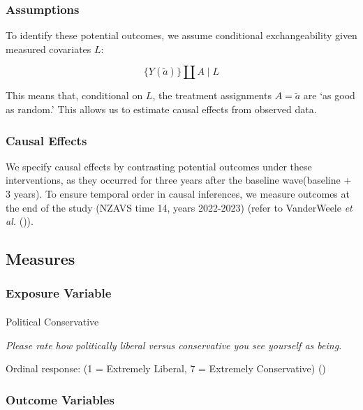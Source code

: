\documentclass[
  single column]{article}
\makeatletter
\let\oldparagraph\paragraph
\renewcommand{\paragraph}{
    \@ifstar
      \xxxParagraphStar
      \xxxParagraphNoStar
  }
\newcommand{\xxxParagraphStar}[1]{\oldparagraph*{#1}\mbox{}}
\newcommand{\xxxParagraphNoStar}[1]{\oldparagraph{#1}\mbox{}}
\makeatother
\begin{document}
\subsubsection{Assumptions}\label{assumptions}

To identify these potential outcomes, we assume conditional
exchangeability given measured covariates \(L\):

\[
\Big\{ Y(\tilde{a}) \Big\} \coprod A \mid L
\]

This means that, conditional on \(L\), the treatment assignments
\(A = \tilde{a}\) are `as good as random.' This allows us to estimate
causal effects from observed data.

\subsubsection{Causal Effects}\label{causal-effects}

We specify causal effects by contrasting potential outcomes under these
interventions, as they occurred for three years after the baseline
wave(baseline + 3 years). To ensure temporal order in causal inferences,
we measure outcomes at the end of the study (NZAVS time 14, years
2022-2023) (refer to VanderWeele \emph{et al.}
()).

\subsection{Measures}\label{measures}

\subsubsection{Exposure Variable}\label{exposure-variable}

\paragraph{Political Conservative}\label{political-conservative}

\emph{Please rate how politically liberal versus conservative you see
yourself as being.}

Ordinal response: (1 = Extremely Liberal, 7 = Extremely Conservative)
()

\subsubsection{Outcome Variables}\label{outcome-variables}
\end{document}
